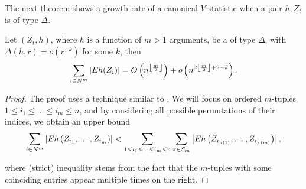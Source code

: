 The next theorem shows a growth rate of  a canonical $V$-statistic when a pair $h,Z_{t}$ is of type $\varDelta$. 
\begin{Theorem}
\label{th:boundTh}
Let $(Z_{t},h)$, where $h$ is a function of $m>1$ arguments, be a  of type $\varDelta$, with $\varDelta(h,r) = o( r^{-k})$ for some $k$, then
\begin{equation*}
\sum_{i\in N^{m}}\left| E  h(Z_i) \right| =  O\left(n^{\left\lfloor \frac{m}{2}\right\rfloor }\right)+ o\left(n^{2\left\lfloor \frac{m}{2}\right\rfloor +2-k}\right).
\end{equation*}
\end{Theorem}
\begin{proof} 
The proof uses a technique similar to   \cite[Lemma 3]{arcones1998law}.
 We will focus on ordered $m$-tuples $1\leq i_{1}\leq\ldots\leq i_{m}\leq n$,
and by considering all possible permutations of their indices, we
obtain an upper bound 
\begin{equation*}
\sum_{i\in N^{m}}\left|E  h\left(Z_{i_{1}},\ldots,Z_{i_{m}}\right)\right|  <  \sum_{1\leq i_{1}\leq\ldots\leq i_{m}\leq n}\sum_{\pi\in S_{m}}\left|  E h\left(Z_{i_{\pi(1)}},\ldots,Z_{i_{\pi(m)}}\right)\right|,
\end{equation*}

where (strict) inequality stems from the fact that the $m$-tuples
with some coinciding entries appear multiple times on the right.


\end{proof}
